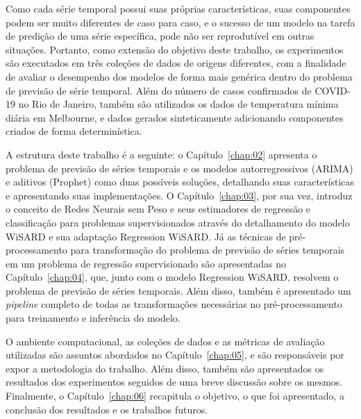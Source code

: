 Como cada série temporal possui suas próprias características, suas componentes podem ser muito diferentes de caso para caso, e o sucesso de um modelo na tarefa de predição de uma série específica, pode não ser reprodutível em outras situações. Portanto, como extensão do objetivo deste trabalho, os experimentos são executados em três coleções de dados de origens diferentes, com a finalidade de avaliar o desempenho dos modelos de forma mais genérica dentro do problema de previsão de série temporal. Além do número de casos confirmados de COVID-19 no Rio de Janeiro, também são utilizados os dados de temperatura mínima diária em Melbourne, e dados gerados sinteticamente adicionando componentes criados de forma determinística.

A estrutura deste trabalho é a seguinte: o Capítulo~\ref{chap:02} apresenta o problema de previsão de séries temporais e os modelos autorregressivos (ARIMA) e aditivos (Prophet) como duas possíveis soluções, detalhando suas características e apresentando suas implementações. O Capítulo~\ref{chap:03}, por sua vez, introduz o conceito de Redes Neurais sem Peso e seus estimadores de regressão e classificação para problemas supervisionados através do detalhamento do modelo WiSARD e sua adaptação Regression WiSARD. Já as técnicas de pré-processamento para transformação do problema de previsão de séries temporais em um problema de regressão supervisionado são apresentadas no Capítulo~\ref{chap:04}, que, junto com o modelo Regression WiSARD, resolvem o problema de previsão de séries temporais. Além disso, também é apresentado um \textit{pipeline} completo de todas as transformações necessárias no pré-processamento para treinamento e inferência do modelo.

O ambiente computacional, as coleções de dados e as métricas de avaliação utilizadas são assuntos abordados no Capítulo~\ref{chap:05}, e são responsáveis por expor a metodologia do trabalho. Além disso, também são apresentados os resultados dos experimentos seguidos de uma breve discussão sobre os mesmos. Finalmente, o Capítulo~\ref{chap:06} recapitula o objetivo, o que foi apresentado, a conclusão dos resultados e os trabalhos futuros.